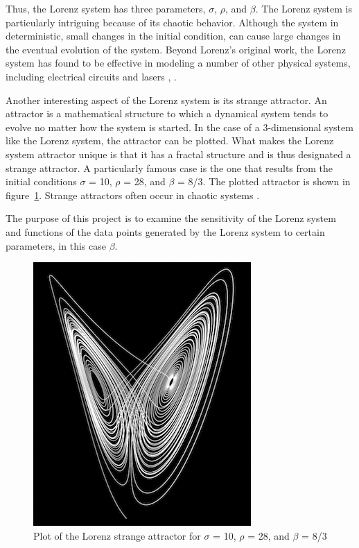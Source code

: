 \documentclass{article}[11pt]
\begin{document}
Thus, the Lorenz system has three parameters, $\sigma$, $\rho$, and $\beta$.  The Lorenz system is particularly intriguing because of its chaotic behavior.  Although the system in deterministic, small changes in the initial condition, can cause large changes in the eventual evolution of the system.  Beyond Lorenz's original work, the Lorenz system has found to be effective in modeling a number of other physical systems, including electrical circuits and lasers \cite{attractor}, \cite{lasers}. 

Another interesting aspect of the Lorenz system is its strange attractor.  An attractor is a mathematical structure to which a dynamical system tends to evolve no matter how the system is started.  In the case of a 3-dimensional system like the Lorenz system, the attractor can be plotted.  What makes the Lorenz system attractor unique is that it has a fractal structure and is thus designated a strange attractor.  A particularly famous case is the one that results from the initial conditions $\sigma$ = 10, $\rho$ = 28, and $\beta$ = 8/3.  The plotted attractor is shown in figure~\ref{fig:lorenz}.  Strange attractors often occur in chaotic systems \cite{Viswanath}.

The purpose of this project is to examine the sensitivity of the Lorenz system and functions of the data points generated by the Lorenz system to certain parameters, in this case $\beta$.

\begin{figure}[H]
\centering
\includegraphics[scale = 0.6]{lorenz2.png}
\caption{Plot of the Lorenz strange attractor for $\sigma$ = 10, $\rho$ = 28, and $\beta$ = 8/3 \cite{bourke}}
\label{fig:lorenz}
\end{figure}
\end{document}
